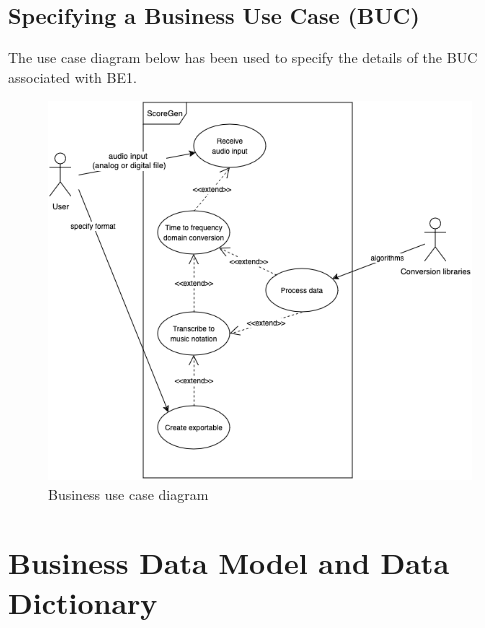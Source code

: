 \documentclass[12pt]{article}
\begin{document}
\subsection{Specifying a Business Use Case (BUC)}
The use case diagram below has been used to specify the details of the BUC 
associated with BE1.\\
\begin{figure}[H]
  \includegraphics[width=\textwidth]{BUC-revised.png}
  \caption{Business use case diagram}
\end{figure}

\section{Business Data Model and Data Dictionary}
\end{document}
